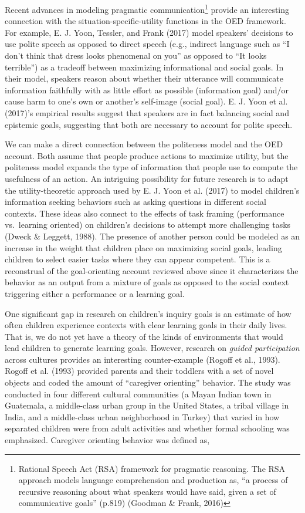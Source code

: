 \documentclass[english,floatsintext,man]{apa6}
\theoremstyle{definition}
\theoremstyle{definition}
\theoremstyle{definition}
\theoremstyle{remark}
\begin{document}
Recent advances in modeling pragmatic communication\footnote{Rational
  Speech Act (RSA) framework for pragmatic reasoning. The RSA approach
  models language comprehension and production as, \enquote{a process of
  recursive reasoning about what speakers would have said, given a set
  of communicative goals} (p.819) (Goodman \& Frank, 2016)} provide an
interesting connection with the situation-specific-utility functions in
the OED framework. For example, E. J. Yoon, Tessler, and Frank (2017)
model speakers' decisions to use polite speech as opposed to direct
speech (e.g., indirect language such as \enquote{I don't think that
dress looks phenomenal on you} as opposed to \enquote{It looks
terrible}) as a tradeoff between maximizing informational and social
goals. In their model, speakers reason about whether their utterance
will communicate information faithfully with as little effort as
possible (information goal) and/or cause harm to one's own or another's
self-image (social goal). E. J. Yoon et al. (2017)'s empirical results
suggest that speakers are in fact balancing social and epistemic goals,
suggesting that both are necessary to account for polite speech.

We can make a direct connection between the politeness model and the OED
account. Both assume that people produce actions to maximize utility,
but the politeness model expands the type of information that people use
to compute the usefulness of an action. An intriguing possibility for
future research is to adapt the utility-theoretic approach used by E. J.
Yoon et al. (2017) to model children's information seeking behaviors
such as asking questions in different social contexts. These ideas also
connect to the effects of task framing (performance vs.~learning
oriented) on children's decisions to attempt more challenging tasks
(Dweck \& Leggett, 1988). The presence of another person could be
modeled as an increase in the weight that children place on maximizing
social goals, leading children to select easier tasks where they can
appear competent. This is a reconstrual of the goal-orienting account
reviewed above since it characterizes the behavior as an output from a
mixture of goals as opposed to the social context triggering either a
performance or a learning goal.

One significant gap in research on children's inquiry goals is an
estimate of how often children experience contexts with clear learning
goals in their daily lives. That is, we do not yet have a theory of the
kinds of environments that would lead children to generate learning
goals. However, research on \emph{guided participation} across cultures
provides an interesting counter-example (Rogoff et al., 1993). Rogoff et
al. (1993) provided parents and their toddlers with a set of novel
objects and coded the amount of \enquote{caregiver orienting} behavior.
The study was conducted in four different cultural communities (a Mayan
Indian town in Guatemala, a middle-class urban group in the United
States, a tribal village in India, and a middle-class urban neighborhood
in Turkey) that varied in how separated children were from adult
activities and whether formal schooling was emphasized. Caregiver
orienting behavior was defined as,
\end{document}
